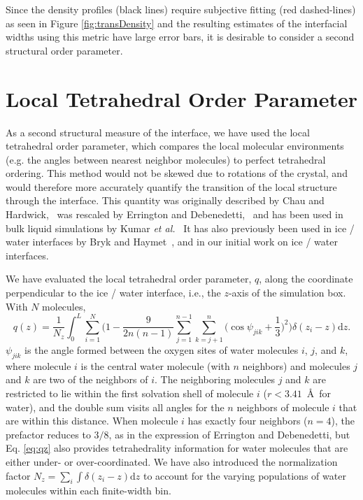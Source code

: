 Since the density profiles (black lines) require subjective fitting
(red dashed-lines) as seen in Figure \ref{fig:transDensity} and the
resulting estimates of the interfacial widths using this metric have
large error bars, it is desirable to consider a second structural
order parameter.

\section{Local Tetrahedral Order Parameter}\label{sec:tetra}
As a second structural measure of the interface, we have used the
local tetrahedral order parameter, which compares the local molecular
environments (e.g. the angles between nearest neighbor molecules) to
perfect tetrahedral ordering. This method would not be skewed due to
rotations of the crystal, and would therefore more accurately quantify
the transition of the local structure through the interface. This
quantity was originally described by Chau and
Hardwick,~\cite{Chau1998} was rescaled by Errington and
Debenedetti,~\cite{Errington2001} and has been used in bulk liquid
simulations by Kumar \textit{et al.}~\cite{Kumar2009} It has also
previously been used in ice / water interfaces by Bryk and
Haymet~\cite{Bryk2004}, and in our initial work on ice / water
interfaces\cite{Louden2013a}.

We have evaluated the local tetrahedral order parameter, $q$, along
the coordinate perpendicular to the ice / water interface, i.e., the
$z$-axis of the simulation box. With $N$ molecules,
\begin{equation}
q(z) = \frac{1}{N_z} \int_0^L \sum_{i=1}^{N} \Bigg(1 -\frac{9}{2n(n-1)}\sum_{j=1}^{n-1}
\sum_{k=j+1}^{n} \bigg(\cos\psi_{jik}+\frac{1}{3}\bigg)^2\Bigg)
\delta(z_{i}-z)\mathrm{d}z .
\label{eq:qz}
\end{equation}
$\psi_{jik}$ is the angle formed between the oxygen sites of water
molecules $i$, $j$, and $k$, where molecule $i$ is the central water
molecule (with $n$ neighbors) and molecules $j$ and $k$ are two of the
neighbors of $i$.  The neighboring molecules $j$ and $k$ are
restricted to lie within the first solvation shell of molecule $i$
($r < 3.41$~\AA\ for water), and the double sum visits all angles for
the $n$ neighbors of molecule $i$ that are within this distance.  When
molecule $i$ has exactly four neighbors ($n=4$), the prefactor reduces
to $3/8$, as in the expression of Errington and Debenedetti, but
Eq. \eqref{eq:qz} also provides tetrahedrality information for water
molecules that are either under- or over-coordinated. We have also
introduced the normalization factor
$N_z = \sum_i \int \delta(z_i - z) \mathrm{d}z$ to account for the
varying populations of water molecules within each finite-width bin.


